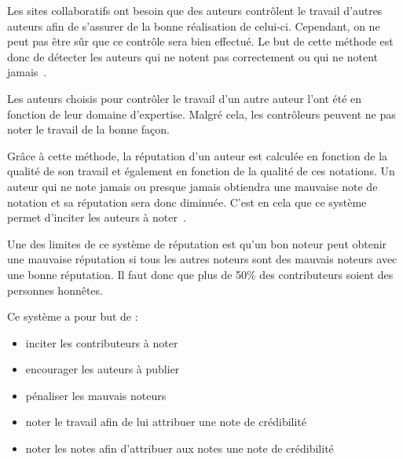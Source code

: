 \documentclass[a4paper, 11pt]{article} %
\begin{document}
Les sites collaboratifs ont besoin que des auteurs contrôlent le travail d'autres auteurs afin de s'assurer de la bonne réalisation de celui-ci. Cependant, on ne peut pas être sûr que ce contrôle sera bien effectué. Le but de cette méthode est donc de détecter les auteurs qui ne notent pas correctement ou qui ne notent jamais~\cite{RaterRating}.

Les auteurs choisis pour contrôler le travail d'un autre auteur l'ont été en fonction de leur domaine d'expertise. Malgré cela, les contrôleurs peuvent ne pas noter le travail de la bonne façon.

Grâce à cette méthode, la réputation d'un auteur est calculée en fonction de la qualité de son travail et également en fonction de la qualité de ces notations. Un auteur qui ne note jamais ou presque jamais obtiendra une mauvaise note de notation et sa réputation sera donc diminuée. C'est en cela que ce système permet d'inciter les auteurs à noter~\cite{RaterRating}.

Une des limites de ce système de réputation est qu'un bon noteur peut obtenir une mauvaise réputation si tous les autres noteurs sont des mauvais noteurs avec une bonne réputation. Il faut donc que plus de 50\% des contributeurs soient des personnes honnêtes.

Ce système a pour but de :
\begin{itemize}
	\item inciter les contributeurs à noter
	\item encourager les auteurs à publier
	\item pénaliser les mauvais noteurs
	\item noter le travail afin de lui attribuer une note de crédibilité
	\item noter les notes afin d'attribuer aux notes une note de crédibilité~\cite{RaterRating}
\end{itemize}
\end{document}
